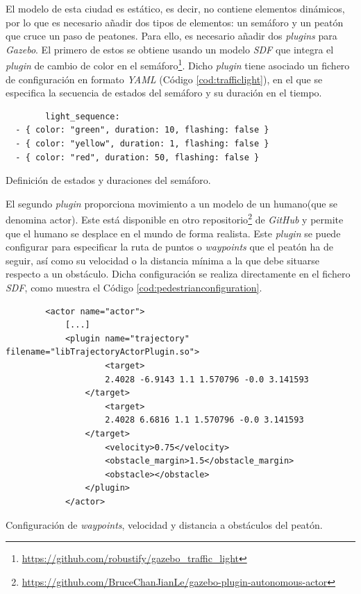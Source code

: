 El modelo de esta ciudad es estático, es decir, no contiene elementos dinámicos, por lo que es necesario añadir dos tipos de elementos: un semáforo y un peatón que cruce un paso de peatones. Para ello, es necesario añadir dos \textit{plugins} para \textit{Gazebo}. El primero de estos se obtiene usando un modelo \textit{SDF} que integra el \textit{plugin} de cambio de color en el semáforo\footnote{\url{https://github.com/robustify/gazebo_traffic_light}}. Dicho \textit{plugin} tiene asociado un fichero de configuración en formato \textit{YAML} (Código \ref{cod:trafficlight}), en el que se especifica la secuencia de estados del semáforo y su duración en el tiempo.\\

\begin{code}[h]
	\begin{lstlisting}
		light_sequence:
  - { color: "green", duration: 10, flashing: false }
  - { color: "yellow", duration: 1, flashing: false }
  - { color: "red", duration: 50, flashing: false }
	\end{lstlisting}
	\caption[Definición de estados y duraciones del semáforo.]{Definición de estados y duraciones del semáforo.}
	\label{cod:trafficlight}
\end{code}

El segundo \textit{plugin} proporciona movimiento a un modelo de un humano(que se denomina actor). Este está disponible en otro repositorio\footnote{\url{https://github.com/BruceChanJianLe/gazebo-plugin-autonomous-actor}} de \textit{GitHub} y permite que el humano se desplace en el mundo de forma realista. Este \textit{plugin} se puede configurar para especificar la ruta de puntos o \textit{waypoints} que el peatón ha de seguir, así como su velocidad o la distancia mínima a la que debe situarse respecto a un obstáculo. Dicha configuración se realiza directamente en el fichero \textit{SDF}, como muestra el Código \ref{cod:pedestrianconfiguration}.\\

\begin{code}[h]
	\begin{lstlisting}
		<actor name="actor">
			[...]
			<plugin name="trajectory" filename="libTrajectoryActorPlugin.so">
					<target>
					2.4028 -6.9143 1.1 1.570796 -0.0 3.141593
				</target>
					<target>
					2.4028 6.6816 1.1 1.570796 -0.0 3.141593
				</target>
					<velocity>0.75</velocity>
					<obstacle_margin>1.5</obstacle_margin>
					<obstacle></obstacle>
				</plugin>
			</actor>
	\end{lstlisting}
	\caption[Configuración de \textit{waypoints}, velocidad y distancia a obstáculos del peatón.]{Configuración de \textit{waypoints}, velocidad y distancia a obstáculos del
		peatón.}
	\label{cod:pedestrianconfiguration}
\end{code}

